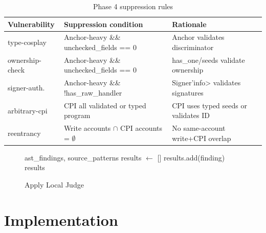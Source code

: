 \documentclass[conference]{IEEEtran}
\begin{document}
\begin{table}[htbp]
  \caption{Phase 4 suppression rules}
  \label{tab:suppression}
  \centering
  \begin{tabular}{p{2.2cm}p{4.5cm}p{3.5cm}}
    \hline
    Vulnerability & Suppression condition & Rationale \\
    \hline
    type-cosplay & Anchor-heavy \&\& unchecked\_fields == 0 & Anchor validates discriminator \\
    ownership-check & Anchor-heavy \&\& unchecked\_fields == 0 & has\_one/seeds validate ownership \\
    signer-auth. & Anchor-heavy \&\& !has\_raw\_handler & Signer'{}info> validates signatures \\
    arbitrary-cpi & CPI all validated or typed program & CPI uses typed seeds or validates ID \\
    reentrancy & Write accounts $\cap$ CPI accounts = $\emptyset$ & No same-account write+CPI overlap \\
    \hline
  \end{tabular}
\end{table}

\begin{figure}[htbp]
\renewcommand{\algorithmicrequire}{\textbf{Input:}}
\renewcommand{\algorithmicensure}{\textbf{Output:}}
\begin{algorithmic}[1]
\REQUIRE ast\_findings, source\_patterns
\STATE results $\gets$ []
  \ENDIF
    \ENDIF
  \ENDIF
    \ENDIF
  \ENDIF
    \ENDIF
  \ENDIF
    \ENDIF
  \ENDIF
  \STATE results.add(finding)
\ENDFOR
\RETURN results
\end{algorithmic}
\caption{Apply Local Judge}
\label{alg:judge}
\end{figure}

\section{Implementation}
\label{sec:impl}
\end{document}
